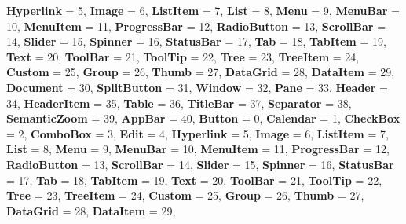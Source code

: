 \begin{DoxyCompactItemize}
{\bfseries Hyperlink} = 5, 
{\bfseries Image} = 6, 
{\bfseries List\+Item} = 7, 
{\bfseries List} = 8, 
\newline
{\bfseries Menu} = 9, 
{\bfseries Menu\+Bar} = 10, 
{\bfseries Menu\+Item} = 11, 
{\bfseries Progress\+Bar} = 12, 
\newline
{\bfseries Radio\+Button} = 13, 
{\bfseries Scroll\+Bar} = 14, 
{\bfseries Slider} = 15, 
{\bfseries Spinner} = 16, 
\newline
{\bfseries Status\+Bar} = 17, 
{\bfseries Tab} = 18, 
{\bfseries Tab\+Item} = 19, 
{\bfseries Text} = 20, 
\newline
{\bfseries Tool\+Bar} = 21, 
{\bfseries Tool\+Tip} = 22, 
{\bfseries Tree} = 23, 
{\bfseries Tree\+Item} = 24, 
\newline
{\bfseries Custom} = 25, 
{\bfseries Group} = 26, 
{\bfseries Thumb} = 27, 
{\bfseries Data\+Grid} = 28, 
\newline
{\bfseries Data\+Item} = 29, 
{\bfseries Document} = 30, 
{\bfseries Split\+Button} = 31, 
{\bfseries Window} = 32, 
\newline
{\bfseries Pane} = 33, 
{\bfseries Header} = 34, 
{\bfseries Header\+Item} = 35, 
{\bfseries Table} = 36, 
\newline
{\bfseries Title\+Bar} = 37, 
{\bfseries Separator} = 38, 
{\bfseries Semantic\+Zoom} = 39, 
{\bfseries App\+Bar} = 40, 
\newline
{\bfseries Button} = 0, 
{\bfseries Calendar} = 1, 
{\bfseries Check\+Box} = 2, 
{\bfseries Combo\+Box} = 3, 
\newline
{\bfseries Edit} = 4, 
{\bfseries Hyperlink} = 5, 
{\bfseries Image} = 6, 
{\bfseries List\+Item} = 7, 
\newline
{\bfseries List} = 8, 
{\bfseries Menu} = 9, 
{\bfseries Menu\+Bar} = 10, 
{\bfseries Menu\+Item} = 11, 
\newline
{\bfseries Progress\+Bar} = 12, 
{\bfseries Radio\+Button} = 13, 
{\bfseries Scroll\+Bar} = 14, 
{\bfseries Slider} = 15, 
\newline
{\bfseries Spinner} = 16, 
{\bfseries Status\+Bar} = 17, 
{\bfseries Tab} = 18, 
{\bfseries Tab\+Item} = 19, 
\newline
{\bfseries Text} = 20, 
{\bfseries Tool\+Bar} = 21, 
{\bfseries Tool\+Tip} = 22, 
{\bfseries Tree} = 23, 
\newline
{\bfseries Tree\+Item} = 24, 
{\bfseries Custom} = 25, 
{\bfseries Group} = 26, 
{\bfseries Thumb} = 27, 
\newline
{\bfseries Data\+Grid} = 28, 
{\bfseries Data\+Item} = 29, 

\end{DoxyCompactItemize}
